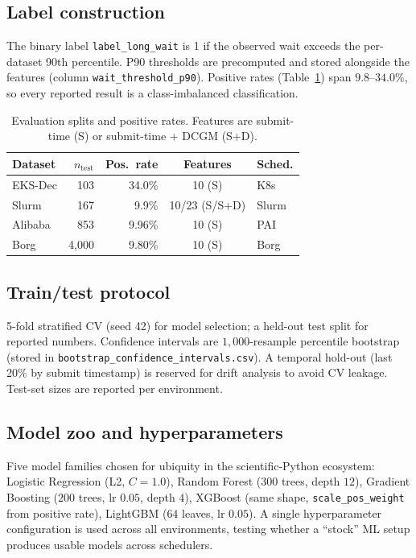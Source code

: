 \documentclass[conference]{IEEEtran}
\begin{document}
\subsection{Label construction}
The binary label \texttt{label\_long\_wait} is 1 if the observed wait exceeds the per-dataset 90th percentile. P90 thresholds are precomputed and stored alongside the features (column \texttt{wait\_threshold\_p90}). Positive rates (Table~\ref{tab:datasets}) span $9.8$--$34.0\%$, so every reported result is a class-imbalanced classification.

\begin{table}[!t]
\centering
\caption{Evaluation splits and positive rates. Features are submit-time (S) or submit-time + DCGM (S+D).}
\label{tab:datasets}
\scriptsize
\setlength{\tabcolsep}{4pt}
\begin{tabular}{@{}lrrcl@{}}
\toprule
\textbf{Dataset} & $n_{\text{test}}$ & \textbf{Pos.\ rate} & \textbf{Features} & \textbf{Sched.} \\
\midrule
EKS-Dec & 103   & 34.0\% & 10 (S)        & K8s    \\
Slurm   & 167   & 9.9\%  & 10/23 (S/S+D) & Slurm  \\
Alibaba & 853   & 9.96\% & 10 (S)        & PAI    \\
Borg    & 4{,}000 & 9.80\% & 10 (S)        & Borg   \\
\bottomrule
\end{tabular}
\end{table}

\subsection{Train/test protocol}
5-fold stratified CV (seed 42) for model selection; a held-out test split for reported numbers. Confidence intervals are $1{,}000$-resample percentile bootstrap (stored in \texttt{bootstrap\_confidence\_intervals.csv}). A temporal hold-out (last 20\% by submit timestamp) is reserved for drift analysis to avoid CV leakage. Test-set sizes are reported per environment.

\subsection{Model zoo and hyperparameters}
Five model families chosen for ubiquity in the scientific-Python ecosystem: Logistic Regression (L2, $C{=}1.0$), Random Forest ($300$ trees, depth $12$), Gradient Boosting ($200$ trees, lr $0.05$, depth $4$), XGBoost (same shape, \texttt{scale\_pos\_weight} from positive rate), LightGBM ($64$ leaves, lr $0.05$). A single hyperparameter configuration is used across all environments, testing whether a ``stock'' ML setup produces usable models across schedulers.
\end{document}
